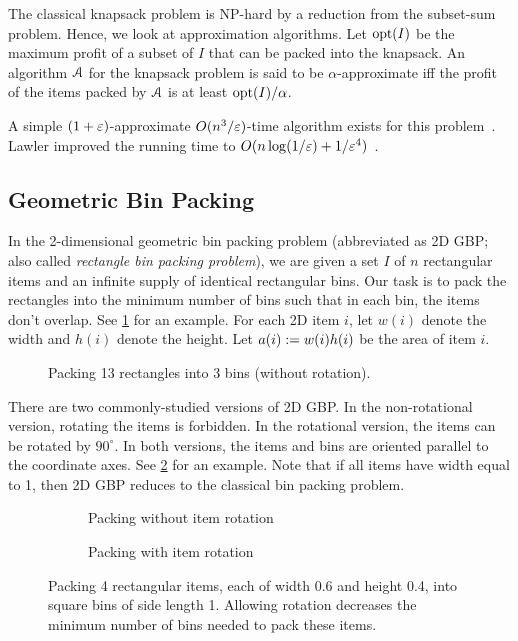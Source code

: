 The classical knapsack problem is NP-hard by a reduction from the subset-sum problem.
Hence, we look at approximation algorithms.
Let $\operatorname{opt}(I)$ be the maximum profit of a subset of $I$ that can be packed into the knapsack.
An algorithm $\mathcal{A}$ for the knapsack problem is said to be $\alpha$-approximate iff
the profit of the items packed by $\mathcal{A}$ is at least $\operatorname{opt}(I)/\alpha$.

A simple $(1+\varepsilon)$-approximate $O(n^3/\varepsilon)$-time algorithm
exists for this problem~\cite{daa:rounding-dp}.
Lawler improved the running time to $O(n\log(1/\varepsilon) + 1/\varepsilon^4)$~\cite{lawler1979fast}.

\subsection{Geometric Bin Packing}

In the 2-dimensional geometric bin packing problem
(abbreviated as 2D GBP; also called \emph{rectangle bin packing problem}),
we are given a set $I$ of $n$ rectangular items and an infinite supply
of identical rectangular bins.
Our task is to pack the rectangles into the minimum number of bins such that
in each bin, the items don't overlap.
See \cref{fig:2gbp-example} for an example.
For each 2D item $i$, let $w(i)$ denote the width and $h(i)$ denote the height.
Let $a(i) := w(i)h(i)$ be the area of item $i$.

\begin{figure}[htb]
\centering

\caption{Packing 13 rectangles into 3 bins (without rotation).}
\label{fig:2gbp-example}
\end{figure}

There are two commonly-studied versions of 2D GBP.
In the non-rotational version, rotating the items is forbidden.
In the rotational version, the items can be rotated by $90^{\circ}$.
In both versions, the items and bins are oriented parallel to the coordinate axes.
See \cref{fig:rot-vs-nonrot} for an example.
Note that if all items have width equal to 1, then 2D GBP reduces to
the classical bin packing problem.

\begin{figure}[htb]
\centering
\begin{subfigure}{0.5\textwidth}
    \centering
    
    \caption{Packing without item rotation}
\end{subfigure}
\begin{subfigure}{0.4\textwidth}
    \centering
    
    \caption{Packing with item rotation}
\end{subfigure}
\caption{Packing 4 rectangular items, each of width 0.6 and height 0.4,
into square bins of side length 1.
Allowing rotation decreases the minimum number of bins needed to pack these items.}
\label{fig:rot-vs-nonrot}
\end{figure}

